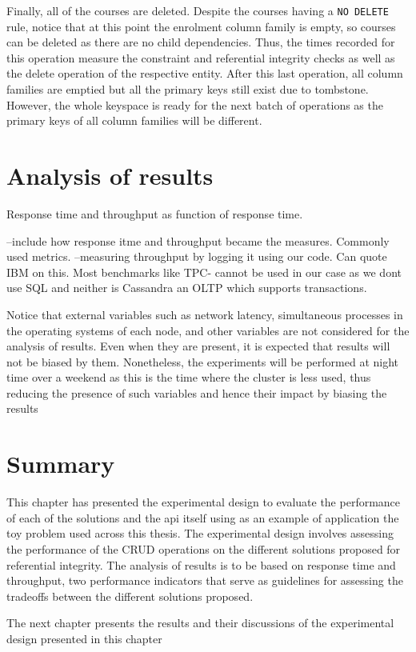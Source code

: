 \begin{description}
Finally, all of the courses are deleted. Despite the courses having a \texttt{NO
DELETE} rule, notice that at this point the enrolment column family is empty, so
courses can be deleted as there are no child dependencies. Thus, the times
recorded for this operation measure the constraint and referential integrity
checks as well as the delete operation of the respective entity. After this last
operation, all column families are emptied but all the primary keys still exist
due to tombstone. However, the whole keyspace is ready for the next batch of
operations as the primary keys of all column families will be different.


\end{description}		


\section{Analysis of results}
	Response time and throughput as function of response time.
	
--include how response itme and throughput became the measures. Commonly used
metrics.
--measuring throughput by logging it using our code. Can quote IBM on this. Most
benchmarks like TPC- cannot be used in our case as we dont use SQL and neither
is Cassandra an OLTP which supports transactions.

	Notice that external variables such as network latency, simultaneous processes
	in the operating systems of each node, and other variables are not considered
	for the analysis of results. Even when they are present, it is expected that
	results will not be biased by them. Nonetheless, the experiments will be
	performed at night time over a weekend as this is the time where the cluster is
	less used, thus reducing the presence of such variables and hence their impact
	by biasing the results 

\section{Summary}
	This chapter has presented the experimental design to evaluate the performance
	of each of the solutions and the api itself using as an example of application
	the toy problem used across this thesis. The experimental design involves
	assessing the performance of the CRUD operations on the different solutions
	proposed for referential integrity. The analysis of results is to be based on
	response time and throughput, two performance indicators that serve as
	guidelines for assessing the tradeoffs between the different solutions
	proposed.
	
	
	The next chapter presents the results and their discussions of the
	experimental design presented in this chapter
 






